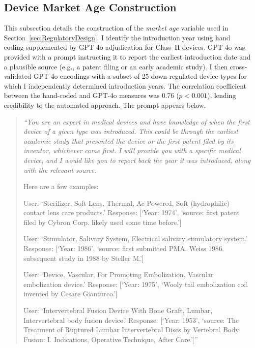 \documentclass[letterpaper,12pt]{article}
\theoremstyle{definition}
\begin{document}
\subsection{Device Market Age Construction}\label{sec:AppendixExperience}

This subsection details the construction of the \emph{market age} variable used in Section~\ref{sec:RegulatoryDesign}. I identify the introduction year using hand coding supplemented by GPT‐4o adjudication for Class~II devices. GPT‐4o was provided with a prompt instructing it to report the earliest introduction date and a plausible source (e.g., a patent filing or an early academic study). I then cross‐validated GPT‐4o encodings with a subset of 25 down-regulated device types for which I independently determined introduction years. The correlation coefficient between the hand-coded and GPT‐4o measures was 0.76 ($p<0.001$), lending credibility to the automated approach. The prompt appears below.


\begin{quotation}
\noindent\itshape
``You are an expert in medical devices and have knowledge of when the first device of a given type was introduced. This could be through the earliest academic study that presented the device or the first patent filed by its inventor, whichever came first. I will provide you with a specific medical device, and I would like you to report back the year it was introduced, along with the relevant source.

Here are a few examples:

User: `Sterilizer, Soft-Lens, Thermal, Ac-Powered, Soft (hydrophilic) contact lens care products.'
Response: [`Year: 1974', `source: first patent filed by Cybron Corp. likely used some time before.']

User: `Stimulator, Salivary System, Electrical salivary stimulatory system.'
Response: [`Year: 1986', `source: first submitted PMA. Weiss 1986. subsequent study in 1988 by Steller M.']

User: `Device, Vascular, For Promoting Embolization, Vascular embolization device.'
Response: [`Year: 1975', `Wooly tail embolization coil invented by Cesare Gianturco.']

User: `Intervertebral Fusion Device With Bone Graft, Lumbar, Intervertebral body fusion device.'
Response: [`Year: 1953', `source: The Treatment of Ruptured Lumbar Intervertebral Discs by Vertebral Body Fusion: I. Indications, Operative Technique, After Care.']''
\end{quotation}
\end{document}
